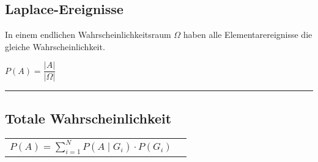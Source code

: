 \subsection{Laplace-Ereignisse  }
In einem endlichen Wahrscheinlichkeitsraum $\Omega$ haben alle
Elementarereignisse die gleiche Wahrscheinlichkeit.
\begin{center}
  $P(A)=\dfrac{\left| A\right|}{\left|\Omega\right|}$
\end{center}
\hrule

\subsection{Totale Wahrscheinlichkeit  }
\begin{tabular}{ll}
  $P(A)=\sum\limits_{i=1}^N P(A\mid G_i)\cdot P(G_i)$
\end{tabular}